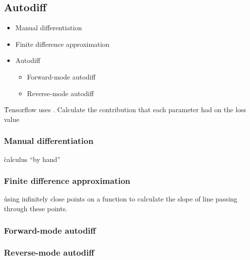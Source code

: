 \subsection{Autodiff}


\begin{itemize}[noitemsep,topsep=0pt]
	\item Manual differentiation
	\item Finite difference approximation
	\item Autodiff
	\begin{itemize}[noitemsep,topsep=0pt]
		\item Forward-mode autodiff
		\item Reverse-mode autodiff
	\end{itemize}
\end{itemize}


\r{Tensorflow uses .  Calculate the contribution that each parameter had on the loss value}

\subsubsection{Manual differentiation}

\r{calculus ``by hand''}

\subsubsection{Finite difference approximation}

\r{using infinitely close points on a function to calculate the slope of line passing through these points.}



\subsubsection{Forward-mode autodiff}



\subsubsection{Reverse-mode autodiff}

